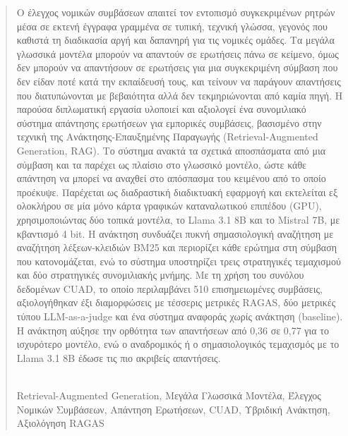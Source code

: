 
\begin{abstract}
Ο έλεγχος νομικών συμβάσεων απαιτεί τον εντοπισμό συγκεκριμένων ρητρών μέσα σε εκτενή έγγραφα γραμμένα σε τυπική, τεχνική γλώσσα, γεγονός που καθιστά τη διαδικασία αργή και δαπανηρή για τις νομικές ομάδες. Τα μεγάλα γλωσσικά μοντέλα μπορούν να απαντούν σε ερωτήσεις πάνω σε κείμενο, όμως δεν μπορούν να απαντήσουν σε ερωτήσεις για μια συγκεκριμένη σύμβαση που δεν είδαν ποτέ κατά την εκπαίδευσή τους, και τείνουν να παράγουν απαντήσεις που διατυπώνονται με βεβαιότητα αλλά δεν τεκμηριώνονται από καμία πηγή. Η παρούσα διπλωματική εργασία υλοποιεί και αξιολογεί ένα συνομιλιακό σύστημα απάντησης ερωτήσεων για εμπορικές συμβάσεις, βασισμένο στην τεχνική της Ανάκτησης-Επαυξημένης Παραγωγής (Retrieval-Augmented Generation, RAG). Το σύστημα ανακτά τα σχετικά αποσπάσματα από μια σύμβαση και τα παρέχει ως πλαίσιο στο γλωσσικό μοντέλο, ώστε κάθε απάντηση να μπορεί να αναχθεί στο απόσπασμα του κειμένου από το οποίο προέκυψε. Παρέχεται ως διαδραστική διαδικτυακή εφαρμογή και εκτελείται εξ ολοκλήρου σε μία μόνο κάρτα γραφικών καταναλωτικού επιπέδου (GPU), χρησιμοποιώντας δύο τοπικά μοντέλα, το Llama 3.1 8B και το Mistral 7B, με κβαντισμό 4 bit. Η ανάκτηση συνδυάζει πυκνή σημασιολογική αναζήτηση με αναζήτηση λέξεων-κλειδιών BM25 και περιορίζει κάθε ερώτημα στη σύμβαση που κατονομάζεται, ενώ το σύστημα υποστηρίζει τρεις στρατηγικές τεμαχισμού και δύο στρατηγικές συνομιλιακής μνήμης. Με τη χρήση του συνόλου δεδομένων CUAD, το οποίο περιλαμβάνει 510 επισημειωμένες συμβάσεις, αξιολογήθηκαν έξι διαμορφώσεις με τέσσερις μετρικές RAGAS, δύο μετρικές τύπου LLM-as-a-judge και ένα σύστημα αναφοράς χωρίς ανάκτηση (baseline). Η ανάκτηση αύξησε την ορθότητα των απαντήσεων από 0,36 σε 0,77 για το ισχυρότερο μοντέλο, ενώ ο αναδρομικός ή ο σημασιολογικός τεμαχισμός με το Llama 3.1 8B έδωσε τις πιο ακριβείς απαντήσεις.

\vspace*{\fill}
\\ 
Retrieval-Augmented Generation, Μεγάλα Γλωσσικά Μοντέλα, Έλεγχος Νομικών Συμβάσεων, Απάντηση Ερωτήσεων, CUAD, Υβριδική Ανάκτηση, Αξιολόγηση RAGAS
\end{abstract}







